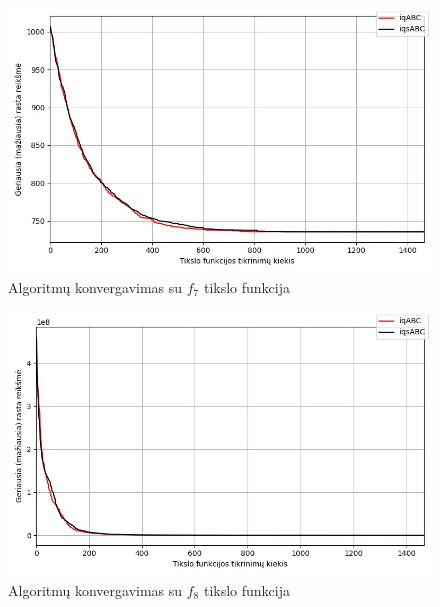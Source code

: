 \documentclass{VUMIFPSmagistrinis}
\begin{document}
\begin{landscape}
\begin{multicols}{2}
\begin{figure}[H]
    \centering
    \includegraphics[scale=0.5]{img/2kg/f7.jpg}
    \caption{Algoritmų konvergavimas su $f_{7}$ tikslo funkcija}
    \label{img:vkonf7}
\end{figure}


\begin{figure}[H]
    \centering
    \includegraphics[scale=0.5]{img/2kg/f8.jpg}
    \caption{Algoritmų konvergavimas su $f_{8}$ tikslo funkcija}
    \label{img:vkonf8}
\end{figure}



\end{multicols}
\begin{multicols}{2}



\end{multicols}
\end{landscape}
\end{document}
